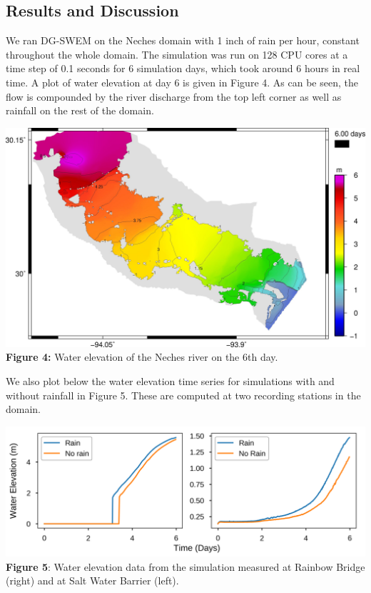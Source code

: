 \documentclass[american]{article}
\begin{document}
\begin{multicols}{3}
\section*{Results and Discussion}
\noindent We ran DG-SWEM on the Neches domain with 1 inch of rain per hour, constant throughout the whole domain. The simulation was run on 128 CPU cores at a time step of 0.1 seconds for 6 simulation days, which took around 6 hours in real time. A plot of water elevation at day 6 is given in Figure 4. As can be seen, the flow is compounded by the river discharge from the top left corner as well as rainfall on the rest of the domain.
\begin{center}
    \vspace{0.5cm}
    \includegraphics[width=0.95 \linewidth]{media/rain.jpg}
    \textbf{Figure 4:} Water elevation of the Neches river on the 6th day.
\end{center}
We also plot below the water elevation time series for simulations with and without rainfall in Figure 5. These are computed at two recording stations in the domain.
\begin{center}
    \vspace{0.5cm}
    \includegraphics[width=0.95 \linewidth]{media/double.png}
    \textbf{Figure 5}: Water elevation data from the simulation measured at Rainbow Bridge (right) and at Salt Water Barrier (left).
\end{center}


\end{multicols}
\end{document}
